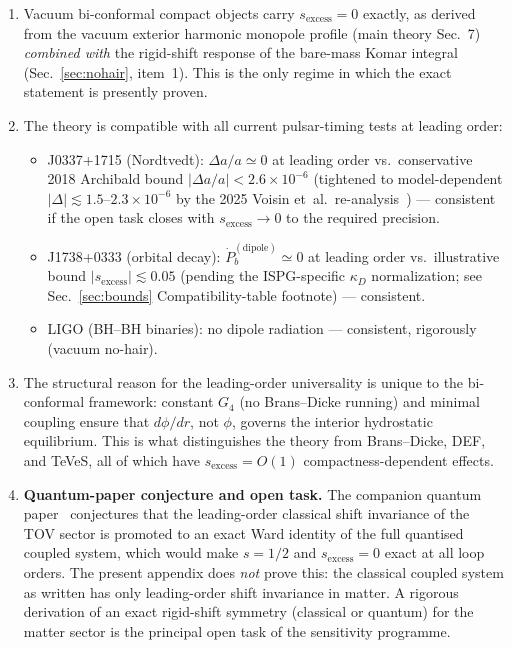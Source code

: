 \documentclass[11pt]{article}
\begin{document}
\begin{enumerate}
\item Vacuum bi-conformal compact objects carry
  $s_{\mathrm{excess}} = 0$ exactly, as derived from
  the vacuum exterior harmonic monopole profile (main theory
  Sec.~7) \emph{combined with} the rigid-shift response
  of the bare-mass Komar integral
  (Sec.~\ref{sec:nohair}, item~1).  This is the only
  regime in which the exact statement is presently
  proven.

\item The theory is compatible with all current
  pulsar-timing tests at leading order:
  \begin{itemize}
  \item J0337+1715 (Nordtvedt): $\Delta a/a \simeq 0$
    at leading order vs.\ conservative 2018
    Archibald bound $|\Delta a/a| < 2.6\times10^{-6}$
    (tightened to model-dependent
    $|\Delta|\lesssim 1.5$--$2.3\times10^{-6}$ by the
    2025 Voisin et~al.\ re-analysis~\cite{Voisin2025})
    --- consistent if the open task closes with
    $s_{\mathrm{excess}}\to 0$ to the required precision.
  \item J1738+0333 (orbital decay):
    $\dot{P}_b^{(\mathrm{dipole})} \simeq 0$ at leading
    order vs.\ illustrative bound
    $|s_{\mathrm{excess}}| \lesssim 0.05$
    (pending the ISPG-specific $\kappa_D$ normalization;
    see Sec.~\ref{sec:bounds} Compatibility-table
    footnote) --- consistent.
  \item LIGO (BH--BH binaries):
    no dipole radiation --- consistent, rigorously
    (vacuum no-hair).
  \end{itemize}

\item The structural reason for the leading-order
  universality is unique to the bi-conformal framework:
  constant $G_4$ (no Brans--Dicke running) and minimal
  coupling ensure that $d\phi/dr$, not $\phi$, governs
  the interior hydrostatic equilibrium.  This is what
  distinguishes the theory from Brans--Dicke, DEF, and
  TeVeS, all of which have $s_{\mathrm{excess}} = O(1)$
  compactness-dependent effects.

\item \textbf{Quantum-paper conjecture and open task.}
  The companion quantum paper~\cite{Lotishvili2026Q}
  conjectures that the leading-order classical shift
  invariance of the TOV sector is promoted to an exact
  Ward identity of the full quantised coupled system,
  which would make $s = 1/2$ and $s_{\mathrm{excess}} = 0$
  exact at all loop orders.  The present appendix does
  \emph{not} prove this: the classical coupled system
  as written has only leading-order shift invariance
  in matter.  A rigorous derivation of an exact rigid-shift
  symmetry (classical or quantum) for the matter sector
  is the principal open task of the sensitivity programme.
\end{enumerate}
\end{document}
